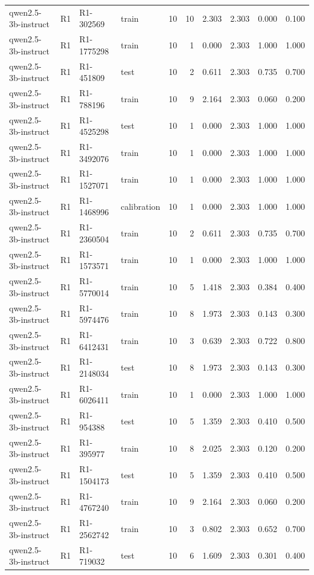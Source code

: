 \begin{table}
\begin{tabular}{llllrrrrrr}
qwen2.5-3b-instruct & R1 & R1-302569 & train & 10 & 10 & 2.303 & 2.303 & 0.000 & 0.100 \\
qwen2.5-3b-instruct & R1 & R1-1775298 & train & 10 & 1 & 0.000 & 2.303 & 1.000 & 1.000 \\
qwen2.5-3b-instruct & R1 & R1-451809 & test & 10 & 2 & 0.611 & 2.303 & 0.735 & 0.700 \\
qwen2.5-3b-instruct & R1 & R1-788196 & train & 10 & 9 & 2.164 & 2.303 & 0.060 & 0.200 \\
qwen2.5-3b-instruct & R1 & R1-4525298 & test & 10 & 1 & 0.000 & 2.303 & 1.000 & 1.000 \\
qwen2.5-3b-instruct & R1 & R1-3492076 & train & 10 & 1 & 0.000 & 2.303 & 1.000 & 1.000 \\
qwen2.5-3b-instruct & R1 & R1-1527071 & train & 10 & 1 & 0.000 & 2.303 & 1.000 & 1.000 \\
qwen2.5-3b-instruct & R1 & R1-1468996 & calibration & 10 & 1 & 0.000 & 2.303 & 1.000 & 1.000 \\
qwen2.5-3b-instruct & R1 & R1-2360504 & train & 10 & 2 & 0.611 & 2.303 & 0.735 & 0.700 \\
qwen2.5-3b-instruct & R1 & R1-1573571 & train & 10 & 1 & 0.000 & 2.303 & 1.000 & 1.000 \\
qwen2.5-3b-instruct & R1 & R1-5770014 & train & 10 & 5 & 1.418 & 2.303 & 0.384 & 0.400 \\
qwen2.5-3b-instruct & R1 & R1-5974476 & train & 10 & 8 & 1.973 & 2.303 & 0.143 & 0.300 \\
qwen2.5-3b-instruct & R1 & R1-6412431 & train & 10 & 3 & 0.639 & 2.303 & 0.722 & 0.800 \\
qwen2.5-3b-instruct & R1 & R1-2148034 & test & 10 & 8 & 1.973 & 2.303 & 0.143 & 0.300 \\
qwen2.5-3b-instruct & R1 & R1-6026411 & train & 10 & 1 & 0.000 & 2.303 & 1.000 & 1.000 \\
qwen2.5-3b-instruct & R1 & R1-954388 & test & 10 & 5 & 1.359 & 2.303 & 0.410 & 0.500 \\
qwen2.5-3b-instruct & R1 & R1-395977 & train & 10 & 8 & 2.025 & 2.303 & 0.120 & 0.200 \\
qwen2.5-3b-instruct & R1 & R1-1504173 & test & 10 & 5 & 1.359 & 2.303 & 0.410 & 0.500 \\
qwen2.5-3b-instruct & R1 & R1-4767240 & train & 10 & 9 & 2.164 & 2.303 & 0.060 & 0.200 \\
qwen2.5-3b-instruct & R1 & R1-2562742 & train & 10 & 3 & 0.802 & 2.303 & 0.652 & 0.700 \\
qwen2.5-3b-instruct & R1 & R1-719032 & test & 10 & 6 & 1.609 & 2.303 & 0.301 & 0.400 \\

\end{tabular}
\end{table}
